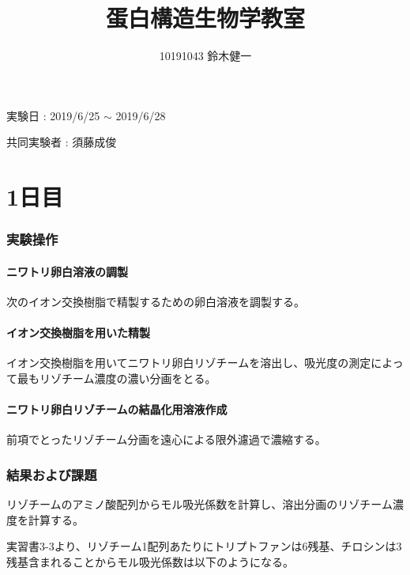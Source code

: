 \documentclass[a4paper,papersize,dvipdfmx]{jsarticle}
\begin{document}
\title{蛋白構造生物学教室}
\author{10191043 鈴木健一}
\date{}
\maketitle



\begin{flushright}
実験日 : 2019/6/25 $\sim$ 2019/6/28

共同実験者 : 須藤成俊
\end{flushright}

\part*{1日目}

\section*{実験操作}
\subsection*{ニワトリ卵白溶液の調製}
次のイオン交換樹脂で精製するための卵白溶液を調製する。

\subsection*{イオン交換樹脂を用いた精製}
イオン交換樹脂を用いてニワトリ卵白リゾチームを溶出し、吸光度の測定によって最もリゾチーム濃度の濃い分画をとる。

\subsection*{ニワトリ卵白リゾチームの結晶化用溶液作成}
前項でとったリゾチーム分画を遠心による限外濾過で濃縮する。

\section*{結果および課題}

\begin{tcolorbox}[colback=white,colbacktitle=black,coltitle=white,title={1.}]
リゾチームのアミノ酸配列からモル吸光係数を計算し、溶出分画のリゾチーム濃度を計算する。
\end{tcolorbox}

実習書3-3より、リゾチーム1配列あたりにトリプトファンは6残基、チロシンは3残基含まれることからモル吸光係数は以下のようになる。
\end{document}
